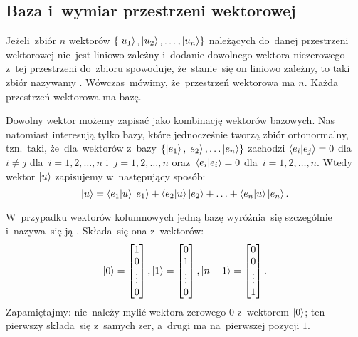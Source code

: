 \subsection{Baza i~wymiar przestrzeni wektorowej}
Jeżeli~zbiór $n$ wektorów $\{\ket{u_1}, \ket{u_2}, \ldots, \ket{u_n}\}$
należących do~danej przestrzeni wektorowej nie~jest
liniowo zależny i~dodanie dowolnego wektora niezerowego z~tej przestrzeni
do~zbioru spowoduje, że~stanie~się on liniowo zależny, to taki zbiór nazywamy . Wówczas~mówimy, że~przestrzeń
wektorowa ma  $n$.
Każda przestrzeń wektorowa ma bazę.

Dowolny wektor możemy zapisać jako kombinację wektorów bazowych.
Nas natomiast interesują tylko bazy, które jednocześnie tworzą zbiór
ortonormalny, tzn.~taki, że~dla~wektorów z~bazy $\{\ket{e_1}, \ket{e_2}, \ldots
	\ket{e_n}\}$ zachodzi $\braket{e_i}{e_j}=0$ dla~$i\neq j$ dla~$i=1,2,\ldots,n$ i~$j=1,2,\ldots,n$ oraz~$\braket{e_i}{e_i}=0$
dla~$i=1,2,\ldots,n$. Wtedy wektor
$\ket{u}$ zapisujemy w~następujący sposób:
$$
	\ket{u}=\braket{e_1}{u}\ket{e_1} + \braket{e_2}{u}\ket{e_2} + \ldots + \braket{e_n}{u}\ket{e_n}.
$$

W~przypadku wektorów kolumnowych jedną bazę wyróżnia~się szczególnie i~nazywa~się
ją . Składa~się ona
z~wektorów:
$$
	\ket{0}=
	\begin{bmatrix}
		1      \\
		0      \\
		\vdots \\
		0      \\
	\end{bmatrix},
	\ket{1}=
	\begin{bmatrix}
		0      \\
		1      \\
		\vdots \\
		0      \\
	\end{bmatrix},
	\ket{n-1}=
	\begin{bmatrix}
		0      \\
		0      \\
		\vdots \\
		1      \\
	\end{bmatrix}.
$$
Zapamiętajmy: nie~należy mylić wektora zerowego $0$ z~wektorem $\ket{0}$; ten pierwszy
składa~się z~samych zer, a~drugi ma na~pierwszej pozycji $1$.

